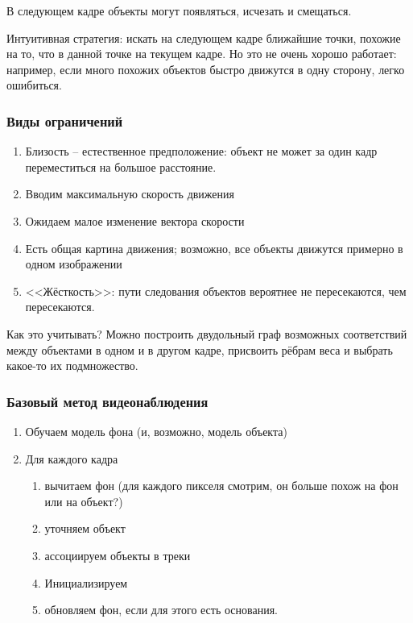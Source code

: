 \documentclass[main.tex]{subfiles}
\begin{document}
В следующем кадре объекты могут появляться, исчезать и смещаться.

Интуитивная стратегия: искать на следующем кадре ближайшие точки, похожие на то, что в данной точке на текущем кадре.
Но это не очень хорошо работает: например, если много похожих объектов быстро движутся в одну сторону, легко ошибиться.

\subsubsection{Виды ограничений}

\begin{enumerate}[noitemsep]
    \item Близость -- естественное предположение: объект не может за один кадр переместиться на большое расстояние.

    \item Вводим максимальную скорость движения

    \item Ожидаем малое изменение вектора скорости

    \item Есть общая картина движения; возможно, все объекты движутся примерно в одном изображении

    \item <<Жёсткость>>: пути следования объектов вероятнее не пересекаются, чем пересекаются.
\end{enumerate}

Как это учитывать?
Можно построить двудольный граф возможных соответствий между объектами в одном и в другом кадре, присвоить рёбрам веса и выбрать какое-то их подмножество.

\subsubsection{Базовый метод видеонаблюдения}

\begin{enumerate}[noitemsep]
    \item Обучаем модель фона (и, возможно, модель объекта)
    \item Для каждого кадра
    \begin{enumerate}[noitemsep]
        \item вычитаем фон (для каждого пикселя смотрим, он больше похож на фон или на объект?)
        \item уточняем объект
        \item ассоциируем объекты в треки
        \item Инициализируем
        \item обновляем фон, если для этого есть основания.
    \end{enumerate}
\end{enumerate}
\end{document}
